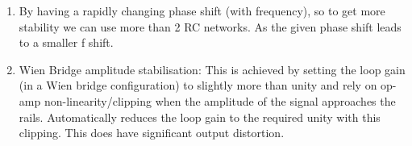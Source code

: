\documentclass[11pt]{article}
\begin{document}
\begin{preview}
\begin{enumerate}
        \item By having a rapidly changing phase shift (with frequency), so to get more stability we can use more than 2 RC networks. As the given phase shift leads to a smaller f shift.
        
        \item Wien Bridge amplitude stabilisation: This is achieved by setting the loop gain (in a Wien bridge configuration) to slightly more than unity and rely on op-amp
        non-linearity/clipping when the amplitude of the signal approaches the rails.
        Automatically reduces the loop gain to the required unity with this clipping. This does have significant output distortion. 
\end{enumerate}
\end{preview}
\end{document}

